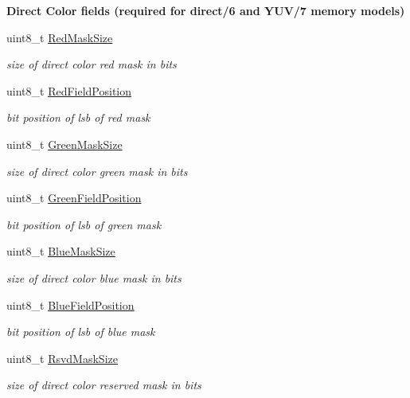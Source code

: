 \begin{Indent}{\bf Direct Color fields (required for direct/6 and Y\+U\+V/7 memory models)}\par
\begin{DoxyCompactItemize}
\item 
uint8\+\_\+t \hyperlink{structvbe__mode__info__t_a5e25f6a8eedde631fff577bcf7d4f6f4}{Red\+Mask\+Size}
\begin{DoxyCompactList}\small\item\em size of direct color red mask in bits \end{DoxyCompactList}\item 
uint8\+\_\+t \hyperlink{structvbe__mode__info__t_a20cb142b8c1b0a2b41244fef469a11f4}{Red\+Field\+Position}
\begin{DoxyCompactList}\small\item\em bit position of lsb of red mask \end{DoxyCompactList}\item 
uint8\+\_\+t \hyperlink{structvbe__mode__info__t_ac7b4df72e505b74493e7d5144cbac743}{Green\+Mask\+Size}
\begin{DoxyCompactList}\small\item\em size of direct color green mask in bits \end{DoxyCompactList}\item 
uint8\+\_\+t \hyperlink{structvbe__mode__info__t_a602b28f8e5da781eabfd736743a6ea09}{Green\+Field\+Position}
\begin{DoxyCompactList}\small\item\em bit position of lsb of green mask \end{DoxyCompactList}\item 
uint8\+\_\+t \hyperlink{structvbe__mode__info__t_a84842a6a42e881ce7be87482122bcc4e}{Blue\+Mask\+Size}
\begin{DoxyCompactList}\small\item\em size of direct color blue mask in bits \end{DoxyCompactList}\item 
uint8\+\_\+t \hyperlink{structvbe__mode__info__t_a4d0396c07a4f07556332fec2b4a6c2bf}{Blue\+Field\+Position}
\begin{DoxyCompactList}\small\item\em bit position of lsb of blue mask \end{DoxyCompactList}\item 
uint8\+\_\+t \hyperlink{structvbe__mode__info__t_a87d544680f1132f30b038c0ebf0b829b}{Rsvd\+Mask\+Size}
\begin{DoxyCompactList}\small\item\em size of direct color reserved mask in bits \end{DoxyCompactList}\item 

\end{DoxyCompactItemize}
\end{Indent}
